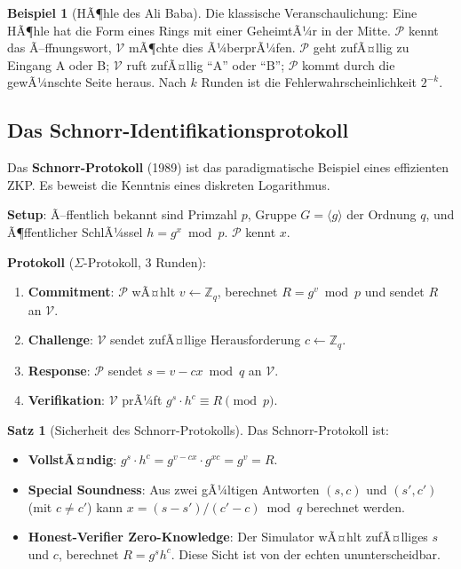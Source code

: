 ﻿\documentclass[a4paper,12pt]{scrreprt}
\theoremstyle{definition}
\newtheorem{beispiel}{Beispiel}[section]
\newtheorem{satz}{Satz}[section]
\begin{document}
\begin{beispiel}[HÃ¶hle des Ali Baba]
Die klassische Veranschaulichung: Eine HÃ¶hle hat die Form eines Rings mit einer GeheimtÃ¼r in der Mitte. $\mathcal{P}$ kennt das Ã–ffnungswort, $\mathcal{V}$ mÃ¶chte dies Ã¼berprÃ¼fen. $\mathcal{P}$ geht zufÃ¤llig zu Eingang A oder B; $\mathcal{V}$ ruft zufÃ¤llig ``A'' oder ``B''; $\mathcal{P}$ kommt durch die gewÃ¼nschte Seite heraus. Nach $k$ Runden ist die Fehlerwahrscheinlichkeit $2^{-k}$.
\end{beispiel}

\subsection{Das Schnorr-Identifikationsprotokoll}

Das \textbf{Schnorr-Protokoll} (1989) ist das paradigmatische Beispiel eines effizienten ZKP. Es beweist die Kenntnis eines diskreten Logarithmus.

\textbf{Setup}: Ã–ffentlich bekannt sind Primzahl $p$, Gruppe $G = \langle g \rangle$ der Ordnung $q$, und Ã¶ffentlicher SchlÃ¼ssel $h = g^x \bmod p$. $\mathcal{P}$ kennt $x$.

\textbf{Protokoll} ($\Sigma$-Protokoll, 3 Runden):
\begin{enumerate}
    \item \textbf{Commitment}: $\mathcal{P}$ wÃ¤hlt $v \leftarrow \mathbb{Z}_q$, berechnet $R = g^v \bmod p$ und sendet $R$ an $\mathcal{V}$.
    \item \textbf{Challenge}: $\mathcal{V}$ sendet zufÃ¤llige Herausforderung $c \leftarrow \mathbb{Z}_q$.
    \item \textbf{Response}: $\mathcal{P}$ sendet $s = v - cx \bmod q$ an $\mathcal{V}$.
    \item \textbf{Verifikation}: $\mathcal{V}$ prÃ¼ft $g^s \cdot h^c \equiv R \pmod{p}$.
\end{enumerate}

\begin{satz}[Sicherheit des Schnorr-Protokolls]
Das Schnorr-Protokoll ist:
\begin{itemize}
    \item \textbf{VollstÃ¤ndig}: $g^s \cdot h^c = g^{v-cx} \cdot g^{xc} = g^v = R$. \checkmark
    \item \textbf{Special Soundness}: Aus zwei gÃ¼ltigen Antworten $(s, c)$ und $(s', c')$ (mit $c \neq c'$) kann $x = (s-s')/(c'-c) \bmod q$ berechnet werden.
    \item \textbf{Honest-Verifier Zero-Knowledge}: Der Simulator wÃ¤hlt zufÃ¤lliges $s$ und $c$, berechnet $R = g^s h^c$. Diese Sicht ist von der echten ununterscheidbar.
\end{itemize}
\end{satz}
\end{document}
